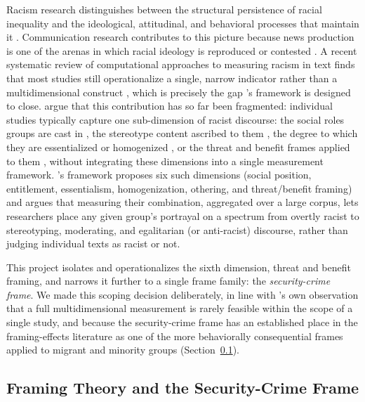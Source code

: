 \documentclass[a4paper,oneside,bibliography=totoc]{scrartcl}
\begin{document}
Racism research distinguishes between the structural persistence of racial inequality and the ideological, attitudinal, and behavioral processes that maintain it \citep{fredrickson2002,omiwinant2014,mills2017,bonillasilva2001}. Communication research contributes to this picture because news production is one of the arenas in which racial ideology is reproduced or contested \citep{vandijk1991,feagin2020}. A recent systematic review of computational approaches to measuring racism in text finds that most studies still operationalize a single, narrow indicator rather than a multidimensional construct \citep{kathirgamalingam2025}, which is precisely the gap \citeauthor{freudenthaler2025}'s framework is designed to close. \citet{freudenthaler2025} argue that this contribution has so far been fragmented: individual studies typically capture one sub-dimension of racist discourse: the social roles groups are cast in \citep{shorvanderijt2024}, the stereotype content ascribed to them \citep{cuddy2008,fiske2018}, the degree to which they are essentialized or homogenized \citep{rothvanstee2023}, or the threat and benefit frames applied to them \citep{eberl2018,guo2023}, without integrating these dimensions into a single measurement framework. \citeauthor{freudenthaler2025}'s framework proposes six such dimensions (social position, entitlement, essentialism, homogenization, othering, and threat/benefit framing) and argues that measuring their combination, aggregated over a large corpus, lets researchers place any given group's portrayal on a spectrum from overtly racist to stereotyping, moderating, and egalitarian (or anti-racist) discourse, rather than judging individual texts as racist or not.

This project isolates and operationalizes the sixth dimension, threat and benefit framing, and narrows it further to a single frame family: the \emph{security-crime frame}. We made this scoping decision deliberately, in line with \citeauthor{freudenthaler2025}'s own observation that a full multidimensional measurement is rarely feasible within the scope of a single study, and because the security-crime frame has an established place in the framing-effects literature as one of the more behaviorally consequential frames applied to migrant and minority groups (Section~\ref{sec:framing-lit}).

\subsection{Framing Theory and the Security-Crime Frame}
\label{sec:framing-lit}
\end{document}
